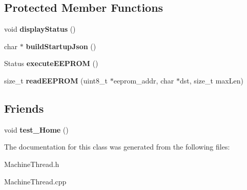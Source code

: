 \subsection*{Protected Member Functions}
\begin{DoxyCompactItemize}
\item 
\hypertarget{classfirestep_1_1_machine_thread_a7bcbd1dcbab0e5a19219311b228e41e7}{void {\bfseries display\+Status} ()}\label{classfirestep_1_1_machine_thread_a7bcbd1dcbab0e5a19219311b228e41e7}

\item 
\hypertarget{classfirestep_1_1_machine_thread_adf8a53b9a4707e08b71485a3f6346653}{char $\ast$ {\bfseries build\+Startup\+Json} ()}\label{classfirestep_1_1_machine_thread_adf8a53b9a4707e08b71485a3f6346653}

\item 
\hypertarget{classfirestep_1_1_machine_thread_a5748af706dc5b71a7acaa310436556c9}{Status {\bfseries execute\+E\+E\+P\+R\+O\+M} ()}\label{classfirestep_1_1_machine_thread_a5748af706dc5b71a7acaa310436556c9}

\item 
\hypertarget{classfirestep_1_1_machine_thread_ac72394eda14bc0be7569243db6a057a0}{size\+\_\+t {\bfseries read\+E\+E\+P\+R\+O\+M} (uint8\+\_\+t $\ast$eeprom\+\_\+addr, char $\ast$dst, size\+\_\+t max\+Len)}\label{classfirestep_1_1_machine_thread_ac72394eda14bc0be7569243db6a057a0}

\end{DoxyCompactItemize}
\subsection*{Friends}
\begin{DoxyCompactItemize}
\item 
\hypertarget{classfirestep_1_1_machine_thread_a018c6a85067bcfc99f7d5a3753ce766d}{void {\bfseries test\+\_\+\+Home} ()}\label{classfirestep_1_1_machine_thread_a018c6a85067bcfc99f7d5a3753ce766d}

\end{DoxyCompactItemize}


The documentation for this class was generated from the following files\+:\begin{DoxyCompactItemize}
\item 
Machine\+Thread.\+h\item 
Machine\+Thread.\+cpp\end{DoxyCompactItemize}
